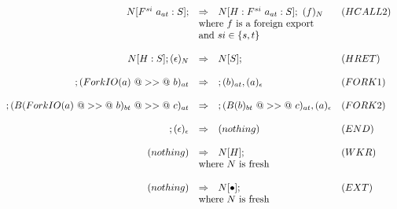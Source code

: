 \documentclass{article}
\newcommand{\hcall}{H}
\newcommand{\fcall}[2]{F^{#1}~#2}
\newcommand{\bound}[1]{B(#1)}
\newcommand{\forkio}[1]{ForkIO(#1)}
\begin{document}
$$\begin{array}{rcll}
\\
N[\fcall{si}{a_{at}} : S]; 
        & \Rightarrow 
        & N[\hcall : \fcall{si}{a_{at}} : S]; ~ (f)_{N} & (HCALL2) \\
        & \multicolumn{2}{l}{\mbox{where $f$ is a foreign export}} \\
        & \multicolumn{2}{l}{\mbox{and}~si \in \{s,t\}} \\
\\
N[\hcall : S]; (\epsilon)_N 
        & \Rightarrow 
        & N[S]; & (HRET) \\
\\
; (\forkio{a}~@>>@~b)_{at}
        & \Rightarrow
        & ; (b)_{at}, (a)_\epsilon & (FORK1) \\
\\
; (\bound{\forkio{a}~@>>@~b}_{bt}~@>>@~c)_{at}
        & \Rightarrow
        & ; (\bound{b}_{bt}~@>>@~c)_{at}, (a)_\epsilon & (FORK2) \\
\\
; (\epsilon)_\epsilon
        & \Rightarrow
        & (nothing) & (END) \\
\\
(nothing)
        & \Rightarrow 
        & N[\hcall]; & (WKR) \\
        & \multicolumn{2}{l}{\mbox{where $N$ is fresh}} \\
\\
(nothing)
        & \Rightarrow 
        & N[\bullet]; & (EXT) \\
        & \multicolumn{2}{l}{\mbox{where $N$ is fresh}} \\
\end{array}
$$
\end{document}
